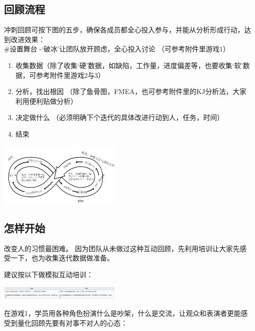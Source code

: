\hypertarget{ux56deux987eux6d41ux7a0b}{%
\subsection{回顾流程}\label{ux56deux987eux6d41ux7a0b}}

冲刺回顾可按下图的五步，确保各成员都全心投入参与，并能从分析形成行动，达到改进效果：\\
\#设置舞台 -`破冰'让团队放开顾虑，全心投入讨论 （可参考附件里游戏1）

\begin{enumerate}
\tightlist
\item
  收集数据（除了收集`硬'数据，如缺陷，工作量，进度偏差等，也要收集`软'数据，可参考附件里游戏2与3）
\item
  分析，找出根因
  （除了鱼骨图，FMEA，也可参考附件里的KJ分析法，大家利用便利贴做分析）
\item
  决定做什么 （必须明确下个迭代的具体改进行动到人，任务，时间）
\item
  结束
\end{enumerate}


\includegraphics[width=6cm]{RetrospectiveScreenshot_2021-09-21_173119.png}

\hypertarget{ux600eux6837ux5f00ux59cb}{%
\subsection{怎样开始}\label{ux600eux6837ux5f00ux59cb}}

改变人的习惯最困难。
因为团队从未做过这种互动回顾，先利用培训让大家先感受一下，也为收集迭代数据做准备。

建议按以下做模拟互动培训：


\includegraphics[width=6cm]{Screenshotfrom2022-12-2921-12-44.png}

在游戏1，学员用各种角色扮演什么是吵架，什么是交流，让观众和表演者更能感受到量化回顾先要有对事不对人的心态：

